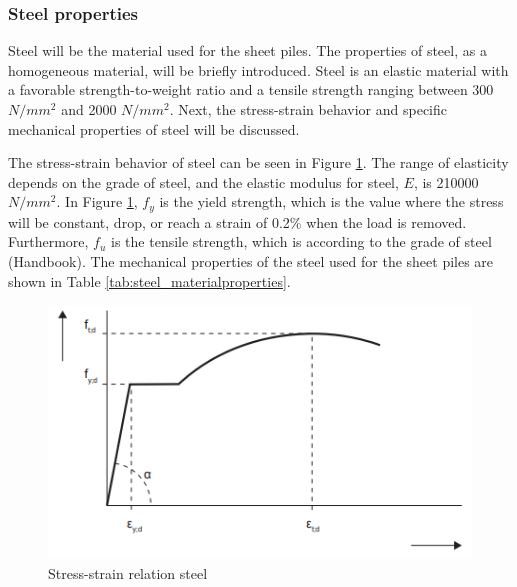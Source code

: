 \subsubsection{Steel properties}

Steel will be the material used for the sheet piles. The properties of steel, as a homogeneous material, will be briefly introduced. Steel is an elastic material with a favorable strength-to-weight ratio and a tensile strength ranging between 300 $N/mm^{2}$ and 2000 $N/mm^{2}$. Next, the stress-strain behavior and specific mechanical properties of steel will be discussed.  

The stress-strain behavior of steel can be seen in Figure \ref{fig:stress_strain_steel}. The range of elasticity depends on the grade of steel, and the elastic modulus for steel, $E$, is 210000 $N/mm^{2}$. In Figure \ref{fig:stress_strain_steel}, $f_{y}$ is the yield strength, which is the value where the stress will be constant, drop, or reach a strain of 0.2\% when the load is removed. Furthermore, $f_{u}$ is the tensile strength, which is according to the grade of steel (Handbook). The mechanical properties of the steel used for the sheet piles are shown in Table \ref{tab:steel_materialproperties}.


\begin{figure}[H]
    \centering
    \includegraphics[width=0.50\linewidth]{figures/ch8/stress_strain_steel.png}
    \caption{Stress-strain relation steel}
    \label{fig:stress_strain_steel}
\end{figure}

